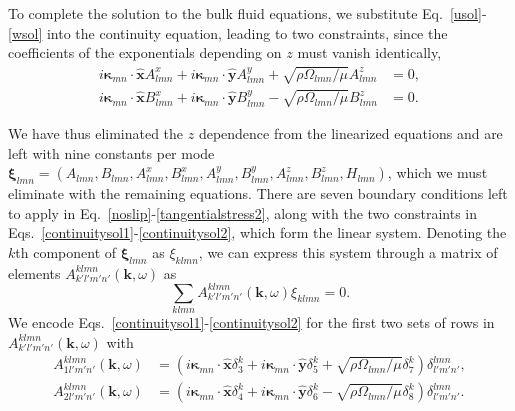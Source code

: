 \documentclass[aps,pre,amsmath,amssymb,floatfix,onecolumn,notitlepage,10pt]{revtex4-1}
\begin{document}
To complete the solution to the bulk fluid equations, we substitute Eq.~\eqref{usol}-\eqref{wsol} into the continuity equation, leading to two constraints, since the coefficients of the exponentials depending on $z$ must vanish identically,
\begin{align}
i\bm{\kappa}_{mn}\cdot\hat{\mathbf{x}}A^x_{lmn}+i\bm{\kappa}_{mn}\cdot\hat{\mathbf{y}}A^y_{lmn}+\sqrt{\rho \Omega_{lmn}/\mu}A^z_{lmn} &= 0, \label{continuitysol1} \\
i\bm{\kappa}_{mn}\cdot\hat{\mathbf{x}}B^x_{lmn}+i\bm{\kappa}_{mn}\cdot\hat{\mathbf{y}}B^y_{lmn}-\sqrt{\rho \Omega_{lmn}/\mu}B^z_{lmn} &= 0. \label{continuitysol2}
\end{align}

We have thus eliminated the $z$ dependence from the linearized equations and are left with nine constants per mode $\bm{\xi}_{lmn}=(A_{lmn}, B_{lmn}, A^x_{lmn}, B^x_{lmn},  A^y_{lmn}, B^y_{lmn},  A^z_{lmn}, B^z_{lmn}, H_{lmn})$, which we must eliminate with the remaining equations. There are seven boundary conditions left to apply in Eq.~\eqref{noslip}-\eqref{tangentialstress2}, along with the two constraints in Eqs.~\eqref{continuitysol1}-\eqref{continuitysol2}, which form the linear system.  Denoting the $k$th component of $\bm{\xi}_{lmn}$ as $\xi_{klmn}$, we can express this system through a matrix of elements $A^{klmn}_{k'l'm'n'}(\mathbf{k}, \omega)$ as
\begin{equation}
\sum_{klmn} A^{klmn}_{k'l'm'n'}(\mathbf{k}, \omega) \xi_{klmn} = 0. \label{linear}
\end{equation}
We encode Eqs.~\eqref{continuitysol1}-\eqref{continuitysol2} for the first two sets of rows in $A^{klmn}_{k'l'm'n'}(\mathbf{k}, \omega)$ with
\begin{align}
A^{klmn}_{1l'm'n'}(\mathbf{k}, \omega) &= (i\bm{\kappa}_{mn}\cdot\hat{\mathbf{x}}\delta^{k}_{3}+i\bm{\kappa}_{mn}\cdot\hat{\mathbf{y}}\delta^{k}_{5}+\sqrt{\rho \Omega_{lmn}/\mu}\delta^{k}_{7})\delta^{lmn}_{l'm'n'}, \label{lconstraint1} \\
A^{klmn}_{2l'm'n'}(\mathbf{k}, \omega) &= (i\bm{\kappa}_{mn}\cdot\hat{\mathbf{x}}\delta^{k}_{4}+i\bm{\kappa}_{mn}\cdot\hat{\mathbf{y}}\delta^{k}_{6}-\sqrt{\rho \Omega_{lmn}/\mu}\delta^{k}_{8})\delta^{lmn}_{l'm'n'}. \label{lconstraint2}
\end{align}
\end{document}
